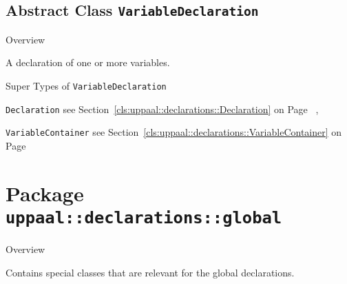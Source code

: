 \subsection{Abstract Class \bfseries \texttt{VariableDeclaration}\normalfont}
\label{cls:uppaal::declarations::VariableDeclaration} 
	
	\begin{longdescription}
		\item[Overview] 		
				

	

		A declaration of one or more variables.		
		\item[Super Types of \texttt{VariableDeclaration}] ~
			\begin{longdescription}
				\item[\texttt{Declaration}] see Section~\ref{cls:uppaal::declarations::Declaration} on Page~\pageref{cls:uppaal::declarations::Declaration}			, 				\item[\texttt{VariableContainer}] see Section~\ref{cls:uppaal::declarations::VariableContainer} on Page~\pageref{cls:uppaal::declarations::VariableContainer}						\end{longdescription}
		
	
	
	\end{longdescription}
	
			\newpage
		\section{Package \bfseries \texttt{uppaal::declarations::global}\normalfont}
		
		\begin{longdescription}
		\item[Overview]			
				

	

		Contains special classes that are relevant for the global declarations.		
		\end{longdescription}
	


